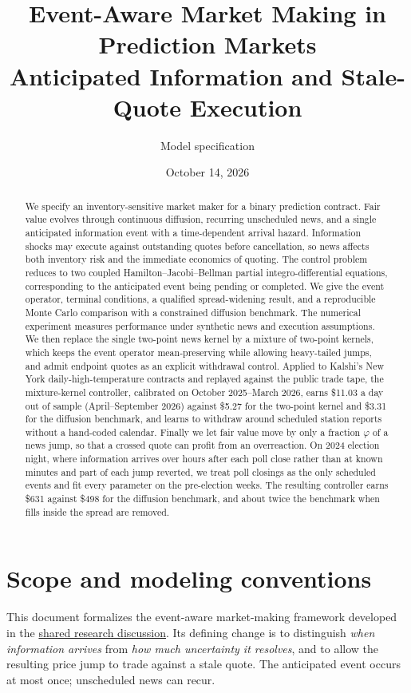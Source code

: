 \documentclass[11pt]{article}
\title{Event-Aware Market Making in Prediction Markets\\\large Anticipated Information and Stale-Quote Execution}
\author{Model specification}
\date{October 14, 2026}
\newcommand{\1}{\mathbf 1}
\begin{document}
\maketitle
\begin{abstract}
We specify an inventory-sensitive market maker for a binary prediction contract.
Fair value evolves through continuous diffusion, recurring unscheduled news,
and a single anticipated information event with a time-dependent arrival hazard.
Information shocks may execute against outstanding quotes before cancellation,
so news affects both inventory risk and the immediate economics of quoting.
The control problem reduces to two coupled Hamilton--Jacobi--Bellman
partial integro-differential equations, corresponding to the anticipated event
being pending or completed. We give the event operator, terminal conditions,
a qualified spread-widening result, and a reproducible Monte Carlo comparison
with a constrained diffusion benchmark. The numerical experiment measures
performance under synthetic news and execution assumptions.
We then replace the single two-point news kernel by a mixture of two-point
kernels, which keeps the event operator mean-preserving while allowing
heavy-tailed jumps, and admit endpoint quotes as an explicit withdrawal
control. Applied to Kalshi's New York daily-high-temperature contracts and
replayed against the public trade tape, the mixture-kernel controller,
calibrated on October 2025--March 2026, earns \$11.03 a day out of sample
(April--September 2026) against \$5.27 for the two-point kernel and \$3.31 for
the diffusion benchmark, and learns to withdraw around scheduled station
reports without a hand-coded calendar. Finally we let fair value move by only a
fraction $\varphi$ of a news jump, so that a crossed quote can profit from an
overreaction. On 2024 election night, where information arrives over hours after each poll
close rather than at known minutes and part of each jump reverted, we treat poll
closings as the only scheduled events and fit every parameter on the pre-election
weeks. The resulting controller earns \$631 against \$498 for the diffusion
benchmark, and about twice the benchmark when fills inside the spread are removed.
\end{abstract}

\section{Scope and modeling conventions}
This document formalizes the event-aware market-making framework developed in the
\href{https://chatgpt.com/s/t_6ad02e77e93c8191b242a759e44d98b6}{shared research discussion}.
Its defining change is to distinguish \emph{when information arrives} from
\emph{how much uncertainty it resolves}, and to allow the resulting price jump
to trade against a stale quote. The anticipated event occurs at most once;
unscheduled news can recur.
\end{document}
